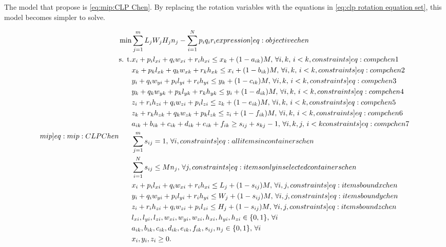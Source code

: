 The model that \textcite{CHEN1995} propose is \cref{eq:mip:CLP Chen}. By replacing the rotation variables with the equations in \cref{eq:clp rotation equation set}, this model becomes simpler to solve.

\begin{subequations}
    \label[mip]{eq:mip:CLP Chen}
    \begin{align}
        \min &\sum_{j=1}^{m}L_jW_jH_jn_j - \sum_{i=1}^{N}p_iq_ir_i \label[expression]{eq:objective chen}\\
        \text{s. t.} &x_i + p_i l_{xi} + q_i w_{xi} + r_i h_{xi} \leq x_k + (1 - a_{ik}) M, \, \forall i, k, \, i < k, \label[constraints]{eq:comp chen 1}\\
        &x_k + p_k l_{xk} + q_k w_{xk} + r_k h_{xk} \leq x_i + (1 - b_{ik}) M, \, \forall i, k, \, i < k, \label[constraints]{eq:comp chen 2}\\
        &y_i + q_i w_{yi} + p_i l_{yi} + r_i h_{yi} \leq y_k + (1 - c_{ik}) M, \, \forall i, k, \, i < k, \label[constraints]{eq:comp chen 3}\\
        &y_k + q_k w_{yk} + p_k l_{yk} + r_k h_{yk} \leq y_i + (1 - d_{ik}) M, \, \forall i, k, \, i < k, \label[constraints]{eq:comp chen 4}\\
        &z_i + r_i h_{zi} + q_i w_{zi} + p_i l_{zi} \leq z_k + (1 - e_{ik}) M, \, \forall i, k, \, i < k, \label[constraints]{eq:comp chen 5}\\
        &z_k + r_k h_{zk} + q_k w_{zk} + p_k l_{zk} \leq z_i + (1 - f_{ik}) M, \, \forall i, k, \, i < k, \label[constraints]{eq:comp chen 6}\\
        &a_{ik} + b_{ik} + c_{ik} + d_{ik} + e_{ik} + f_{ik} \geq s_{ij} + s_{kj} - 1, \, \forall i, k, j, \, i < k \label[constraints]{eq:comp chen 7}\\
        &\sum_{j=1}^{m} s_{ij} = 1, \, \forall i, \label[constraints]{eq:all items in containers chen}\\
        &\sum_{i=1}^{N} s_{ij} \leq M n_j, \, \forall j, \label[constraints]{eq:items only in selected containers chen}\\
        &x_i + p_i l_{xi} + q_i w_{xi} + r_i h_{xi} \leq L_j + (1 - s_{ij}) M, \, \forall i, j, \label[constraints]{eq:items bound x chen}\\
        &y_i + q_i w_{yi} + p_i l_{yi} + r_i h_{yi} \leq W_j + (1 - s_{ij}) M, \, \forall i, j, \label[constraints]{eq:items bound y chen}\\
        &z_i + r_i h_{zi} + q_i w_{zi} + p_i l_{zi} \leq H_j + (1 - s_{ij}) M, \, \forall i, j, \label[constraints]{eq:items bound z chen}\\
        &l_{xi}, l_{yi}, l_{zi}, w_{xi}, w_{yi}, w_{zi}, h_{xi}, h_{yi}, h_{zi} \in \{0,1\}, \, \forall i\\
        &a_{ik}, b_{ik}, c_{ik}, d_{ik}, e_{ik}, f_{ik}, s_{ij}, n_j \in \{0,1\}, \, \forall i\\
        &x_i, y_i, z_i \geq 0.
    \end{align}
\end{subequations}

